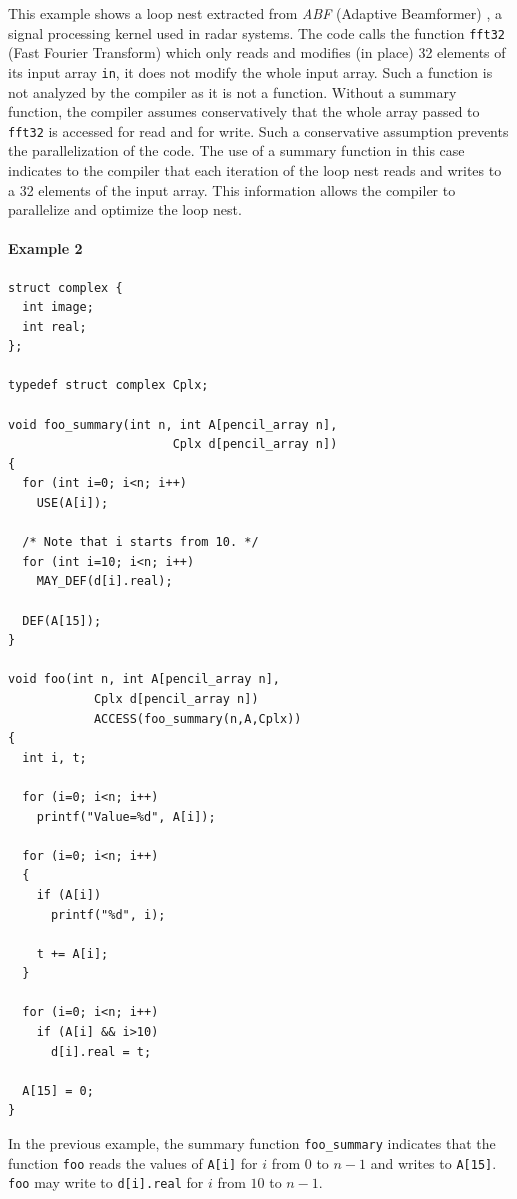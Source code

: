   This example shows a loop nest extracted from
  \emph{ABF} (Adaptive Beamformer) ,
  a signal processing kernel used in radar
  systems.
  The code calls the function \lstinline!fft32! (Fast Fourier Transform)
  which only reads and modifies (in place) 32 elements of its input
  array \lstinline!in!, it does not modify the whole input array.
  Such a function is not analyzed by the \pencil compiler as it is not a \pencil
  function.
  Without a summary function, the compiler assumes conservatively that the whole
  array passed to \lstinline!fft32! is accessed for read and for write.
  Such a conservative assumption prevents the parallelization of the code.
  The use of a summary function in this case indicates to the compiler that
  each iteration of the loop nest reads and writes to a 32 elements
  of the input array.
  This information allows the compiler to parallelize and optimize the loop
  nest.

  
\paragraph{Example 2}
  \begin{lstlisting}[language=pencil]
struct complex {
  int image;
  int real;
};

typedef struct complex Cplx;

void foo_summary(int n, int A[pencil_array n],
                       Cplx d[pencil_array n])
{
  for (int i=0; i<n; i++)
    USE(A[i]);

  /* Note that i starts from 10. */
  for (int i=10; i<n; i++)
    MAY_DEF(d[i].real);

  DEF(A[15]);
}

void foo(int n, int A[pencil_array n],
            Cplx d[pencil_array n])
            ACCESS(foo_summary(n,A,Cplx))
{
  int i, t;

  for (i=0; i<n; i++)
    printf("Value=%d", A[i]);

  for (i=0; i<n; i++)
  {
    if (A[i])
      printf("%d", i);

    t += A[i];
  }

  for (i=0; i<n; i++)
    if (A[i] && i>10)
      d[i].real = t;

  A[15] = 0;
}
  \end{lstlisting}

  In the previous example, the summary function
  \lstinline!foo_summary!  indicates that the function
  \lstinline!foo! reads the values of \lstinline!A[i]!  for $i$
  from $0$ to $n-1$ and writes to \lstinline!A[15]!.
  \lstinline!foo! may write to \lstinline!d[i].real! for $i$
  from $10$ to $n-1$. 

